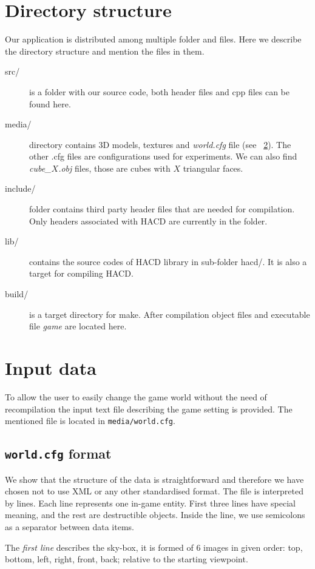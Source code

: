 \section{Directory structure}
Our application is distributed among multiple folder and files. Here we describe the directory structure and mention the files in them.
\begin{description}
\item[src/] is a folder with our source code, both header files and cpp files can be found here.
\item[media/] directory contains 3D models, textures and \emph{world.cfg}  file (see ~\cref{sec:data}). The other .cfg files are configurations used for experiments. We can also find \emph{cube\_$X$.obj} files, those are cubes with $X$ triangular faces.
\item[include/] folder contains third party header files that are needed for compilation. Only headers associated with HACD are currently in the folder.
\item[lib/] contains the source codes of HACD library in sub-folder hacd/. It is also a target for compiling HACD.
\item[build/] is a target directory for make. After compilation object files and executable file \emph{game} are located here. 
\end{description}

\section{Input data}
\label{sec:data}
To allow the user to easily change the game world without the need of recompilation the input text file describing the game setting is provided. The mentioned file is located in {\tt media/world.cfg}. 

\subsection*{{\tt world.cfg} format}
We show that the structure of the data is straightforward and therefore we have chosen not to use XML or any other standardised format. The file is interpreted by lines. Each line represents one in-game entity. First three lines have special meaning, and the rest are destructible objects. Inside the line, we use semicolons as a separator between data items.

The \emph{first line} describes the sky-box, it is formed of 6 images in given order: top, bottom, left, right, front, back; relative to the starting viewpoint. 

